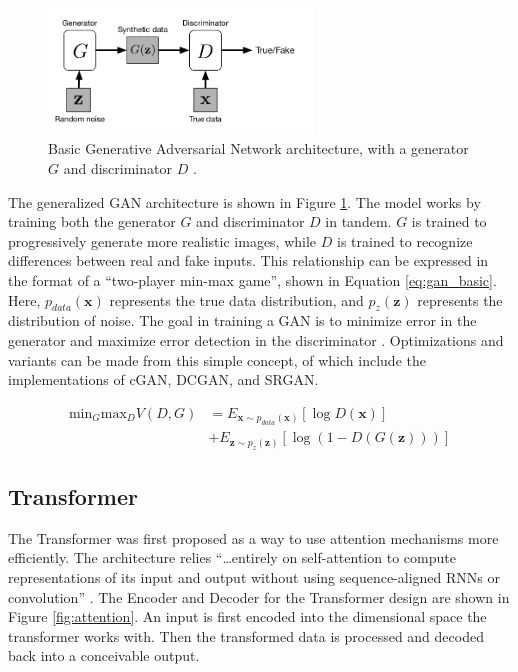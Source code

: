 \documentclass[letterpaper]{article} %
\begin{document}
\begin{figure}[htbp]
\centerline{\includegraphics[width=7cm]{gan_architecture.png}}
\caption{Basic Generative Adversarial Network architecture, with a generator $G$
and discriminator $D$
\cite{cgan}.}
\label{fig:gan_architecture}
\end{figure}

The generalized GAN architecture is shown in Figure \ref{fig:gan_architecture}.
The model works by training both the generator $G$ and
discriminator $D$ in tandem.
$G$ is trained to progressively generate more realistic images,
while $D$ is trained to recognize differences between real and fake inputs.
This relationship can be expressed in the format of a
``two-player min-max game'', shown in Equation \ref{eq:gan_basic}.
Here, $p_{data}(\mathbf{x})$ represents the true data distribution,
and $p_{z}(\mathbf{z})$ represents the distribution of noise.
The goal in training a GAN is to minimize error in the generator
and maximize error detection in the discriminator \cite{cgan}.
Optimizations and variants can be made from this simple concept, of which include
the implementations of cGAN, DCGAN, and SRGAN.

\begin{equation}
\label{eq:gan_basic}
\begin{split}
\text{min}_G\text{max}_DV(D,G) &=
E_{\mathbf{x}\sim p_{data}(\mathbf{x})}[\log D(\mathbf{x})] \\
&+ E_{\mathbf{z}\sim p_{z}(\mathbf{z})}[\log(1 - D(G(\mathbf{z})))]
\end{split}
\end{equation}

\subsection{Transformer}
The Transformer was first proposed
as a way to use attention mechanisms more efficiently.
The architecture relies
``\dots entirely on self-attention to compute representations of its input and output
without using sequence-aligned RNNs or convolution''
\cite{attention_need}.
The Encoder and Decoder for the Transformer design
are shown in Figure \ref{fig:attention}.
An input is first encoded into the dimensional space
the transformer works with.
Then the transformed data is processed
and decoded back into a conceivable output.
\end{document}

